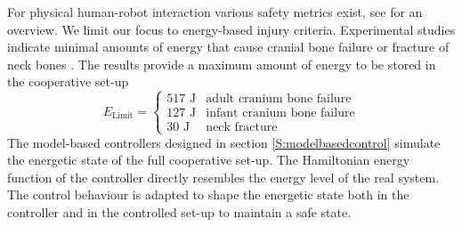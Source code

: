 \documentclass[a4paper,twoside, openright,12pt]{report}
\newcommand{\g}[1]{\text{#1}}
\begin{document}
{For physical human-robot interaction various safety metrics exist, see \cite{Haddadin_14} for an overview. We limit our focus to energy-based injury criteria. Experimental studies indicate minimal amounts of energy  that cause cranial bone failure \cite{Wood_71} or fracture of neck bones \cite{Yoganandan_96}. The results provide a maximum amount of energy to be stored in the cooperative set-up
\begin{equation}
E_{\g{Limit}} = 
\begin{cases}
517 \text{ J} & \text{adult cranium bone failure} \\
127 \text{ J} & \text{infant cranium bone failure} \\
30 \text{ J} & \text{neck fracture}
\end{cases}
\end{equation}
The model-based controllers designed in section \ref{S:modelbasedcontrol} simulate the energetic state of the full cooperative set-up. The Hamiltonian energy function of the controller directly resembles the energy level of the real system. The control behaviour is adapted to shape the energetic state both in the controller and in the controlled set-up to maintain a safe state. 
       
   


}
\end{document}
